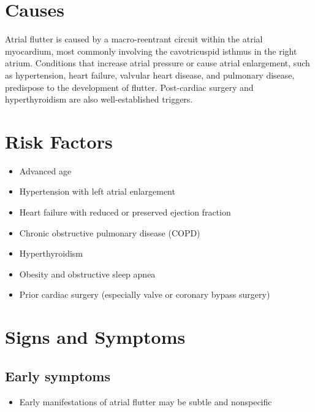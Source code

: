 \section{Causes}
Atrial flutter is caused by a macro-reentrant circuit within the atrial myocardium, most commonly involving the cavotricuspid isthmus in the right atrium. Conditions that increase atrial pressure or cause atrial enlargement, such as hypertension, heart failure, valvular heart disease, and pulmonary disease, predispose to the development of flutter. Post-cardiac surgery and hyperthyroidism are also well-established triggers.

\section{Risk Factors}

\begin{itemize}[noitemsep]
  \item Advanced age
  \item Hypertension with left atrial enlargement
  \item Heart failure with reduced or preserved ejection fraction
  \item Chronic obstructive pulmonary disease (COPD)
  \item Hyperthyroidism
  \item Obesity and obstructive sleep apnea
  \item Prior cardiac surgery (especially valve or coronary bypass surgery)
\end{itemize}

\section{Signs and Symptoms}

\subsection{Early symptoms}
\begin{itemize}[noitemsep]
  \item Early manifestations of atrial flutter may be subtle and nonspecific
\end{itemize}

